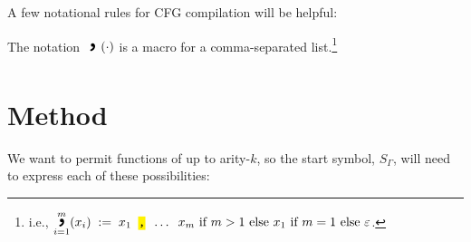 \documentclass[sigplan,nonacm]{acmart}\settopmatter{printfolios=false,printccs=false,printacmref=false}
\newcommand{\codett}[1]{\texttt{\hl{#1}}}
\DeclareMathOperator*{\largecomma}{\mathop{\vcenter{\hbox{\Huge\texttt{,}}}}}
\begin{document}
  A few notational rules for CFG compilation will be helpful:

  \begin{small}
  \end{small}

  \newcommand{\cjoin}[2]{\mathop{\largecomma}\limits_{#1}^{#2}}

  \noindent The notation $\cjoin{}{} (\cdot)$ is a macro for a comma-separated list.\footnote{i.e., $\cjoin{i=1}{m}(x_i)\;:=\; x_1 \gap \codett{,} \gap \ldots \gap x_m \text{ if } m > 1 \text{ else } x_1 \text{ if } m = 1 \text{ else } \varepsilon$.}



  \section{Method}

  We want to permit functions of up to arity-$k$, so the start symbol, $S_\Gamma$, will need to express each of these possibilities:
\end{document}
